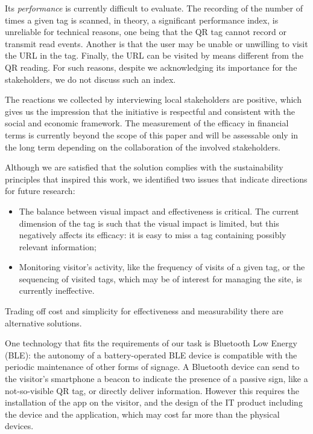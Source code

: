 \documentclass[sustainability,article,submit,pdftex,moreauthors]{Definitions/mdpi}
\begin{document}
Its {\em performance} is currently difficult to evaluate. The recording of the number of times a given tag is scanned, in theory, a significant performance index, is unreliable for technical reasons, one being that the QR tag cannot record or transmit read events. Another is that the user may be unable or unwilling to visit the URL in the tag. Finally, the URL can be visited by means different from the QR reading. For such reasons, despite we acknowledging its importance for the stakeholders, we do not discuss such an index.

The reactions we collected by interviewing local stakeholders are positive, which gives us the impression that the initiative is respectful and consistent with the social and economic framework. The measurement of the efficacy in financial terms is currently beyond the scope of this paper and will be assessable only in the long term depending on the collaboration of the involved stakeholders.

Although we are satisfied that the solution complies with the sustainability principles that inspired this work, we identified two issues that indicate directions for future research:

\begin{itemize}
    \item The balance between visual impact and effectiveness is critical. The current dimension of the tag is such that the visual impact is limited, but this negatively affects its efficacy: it is easy to miss a tag containing possibly relevant information;
    \item Monitoring visitor's activity, like the frequency of visits of a given tag, or the sequencing of visited tags, which may be of interest for managing the site, is currently ineffective.
\end{itemize}

Trading off cost and simplicity for effectiveness and measurability there are alternative solutions.

One technology that fits the requirements of our task is Bluetooth Low Energy (BLE): the autonomy of a battery-operated BLE device is compatible with the periodic maintenance of other forms of signage. A Bluetooth device can send to the visitor's smartphone a beacon to indicate the presence of a passive sign, like a not-so-visible QR tag, or directly deliver information. However this requires the installation of the app on the visitor, and the design of the IT product including the device and the application, which may cost far more than the physical devices. 
\end{document}
